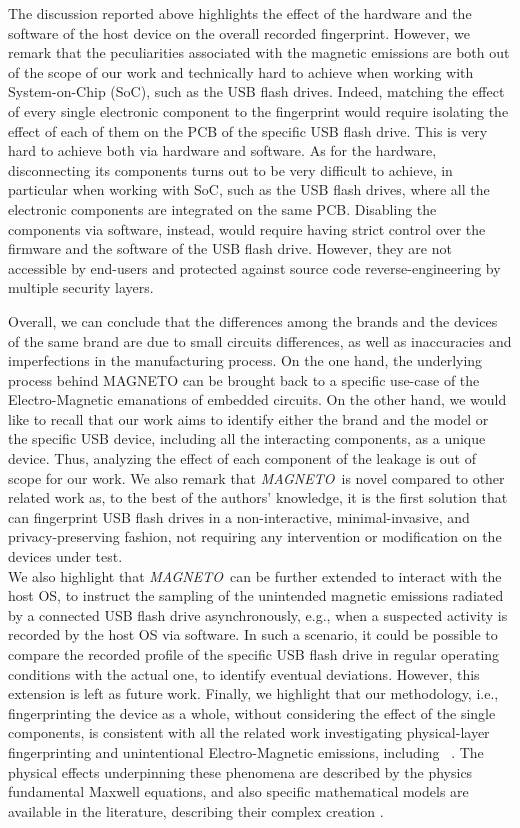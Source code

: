 \documentclass[acmsmall, authorversion]{acmart}
\newcommand{\sol}{\emph{MAGNETO}}
\begin{document}
%
The discussion reported above highlights the effect of the hardware and the software of the host device on the overall recorded fingerprint. However, we remark that the peculiarities associated with the magnetic emissions are both out of the scope of our work and technically hard to achieve when working with System-on-Chip (SoC), such as the USB flash drives.
Indeed, matching the effect of every single electronic component to the fingerprint would require isolating the effect of each of them on the PCB of the specific USB flash drive. This is very hard to achieve both via hardware and software. As for the hardware, disconnecting its components turns out to be very difficult to achieve, in particular when working with SoC, such as the USB flash drives, where all the electronic components are integrated on the same PCB. Disabling the components via software, instead, would require having strict control over the firmware and the software of the USB flash drive. However, they are not accessible by end-users and protected against source code reverse-engineering by multiple security layers.

%
Overall, we can conclude that the differences among the brands and the devices of the same brand are due to small circuits differences, as well as inaccuracies and imperfections in the manufacturing process. On the one hand, the underlying process behind MAGNETO can be brought back to a specific use-case of the Electro-Magnetic emanations of embedded circuits. On the other hand, we would like to recall that our work aims to identify either the brand and the model or the specific USB device, including all the interacting components, as a unique device. Thus, analyzing the effect of each component of the leakage is out of scope for our work. We also remark that \sol\ is novel compared to other related work as, to the best of the authors' knowledge, it is the first solution that can fingerprint USB flash drives in a non-interactive, minimal-invasive, and privacy-preserving fashion, not requiring any intervention or modification on the devices under test.\\
We also highlight that \sol\ can be further extended to interact with the host OS, to instruct the sampling of the unintended magnetic emissions radiated by a connected USB flash drive asynchronously, e.g., when a suspected activity is recorded by the host OS via software. In such a scenario, it could be possible to compare the recorded profile of the specific USB flash drive in regular operating conditions with the actual one, to identify eventual deviations. However, this extension is left as future work.
Finally, we highlight that our methodology, i.e., fingerprinting the device as a whole, without considering the effect of the single components, is consistent with all the related work investigating physical-layer fingerprinting and unintentional Electro-Magnetic emissions, including ~\cite{Dejean2007, camurati2018, cobb2010, Cobb2012_tifs, wright2014, bihl2016, Dubendorfer2012, ramsey2012, Suski2008, lukacs2015, Cheng2019_ccs}. The physical effects underpinning these phenomena are described by the physics fundamental Maxwell equations, and also specific mathematical models are available in the literature, describing their complex creation \cite{bole2009}.
\end{document}
